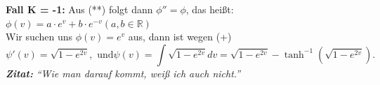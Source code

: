 \begin{solution}
\begin{enumerate}[label=(\alph*)]
  
  \textbf{Fall K = -1:} Aus (**) folgt dann \( \phi'' = \phi \), das heißt: \\
  \( \phi(v) = a \cdot e^v + b \cdot e^{-v} (a,b \in \mathbb{R}) \) \\
  Wir suchen uns \( \phi(v) = e^v \) aus, dann ist wegen (+)
  \begin{equation*}
    \psi'(v) = \sqrt{ 1- e^{2v}}, \text{ und} \psi(v) = \int{ \sqrt{ 1 - e^{2v}}}dv = \sqrt{ 1 - e^{2v}} -\tanh^{-1}(\sqrt{ 1- e^{2v}}).
  \end{equation*}
  \emph{\textbf{Zitat:}} \emph{``Wie man darauf kommt, weiß ich auch nicht.''}
  
  \end{enumerate} 
\end{solution}

